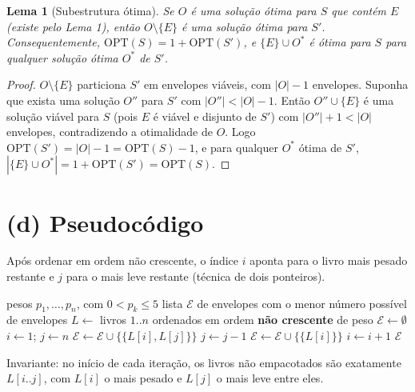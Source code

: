 \documentclass[11pt,a4paper]{article}
\newtheorem{lema}{Lema}
\begin{document}
\begin{lema}[Subestrutura ótima]
Se $O$ é uma solução ótima para $S$ que contém $E$ (existe pelo Lema 1), então
$O \setminus \{E\}$ é uma solução ótima para $S'$. Consequentemente,
$\mathrm{OPT}(S) = 1 + \mathrm{OPT}(S')$, e $\{E\} \cup O^*$ é ótima para $S$ para
qualquer solução ótima $O^*$ de $S'$.
\end{lema}

\begin{proof}
$O\setminus\{E\}$ particiona $S'$ em envelopes viáveis, com $|O|-1$ envelopes.
Suponha que exista uma solução $O''$ para $S'$ com $|O''| < |O|-1$. Então
$O''\cup\{E\}$ é uma solução viável para $S$ (pois $E$ é viável e disjunto de $S'$)
com $|O''|+1 < |O|$ envelopes, contradizendo a otimalidade de $O$. Logo
$\mathrm{OPT}(S') = |O|-1 = \mathrm{OPT}(S)-1$, e para qualquer $O^*$ ótima de $S'$,
$|\{E\}\cup O^*| = 1+\mathrm{OPT}(S') = \mathrm{OPT}(S)$.
\end{proof}

\section*{(d) Pseudocódigo}

Após ordenar em ordem não crescente, o índice $i$ aponta para o livro mais pesado
restante e $j$ para o mais leve restante (técnica de dois ponteiros).

\begin{algorithm}[H]
\caption{\textsc{Empacota-Livros}$(p, n)$}
\begin{algorithmic}[1]
\Require pesos $p_1,\dots,p_n$, com $0 < p_k \le 5$
\Ensure lista $\mathcal{E}$ de envelopes com o menor número possível de envelopes
\State $L \gets$ livros $1..n$ ordenados em ordem \textbf{não crescente} de peso 
\State $\mathcal{E} \gets \emptyset$
\State $i \gets 1$; \quad $j \gets n$
   
    \State $\mathcal{E} \gets \mathcal{E} \cup \{\{L[i], L[j]\}\}$
    \State $j \gets j - 1$
  \Else {}
    \State $\mathcal{E} \gets \mathcal{E} \cup \{\{L[i]\}\}$
  \EndIf
  \State $i \gets i + 1$
\EndWhile
\State \Return $\mathcal{E}$
\end{algorithmic}
\end{algorithm}

Invariante: no início de cada iteração, os livros não empacotados são exatamente
$L[i..j]$, com $L[i]$ o mais pesado e $L[j]$ o mais leve entre eles.
\end{document}
